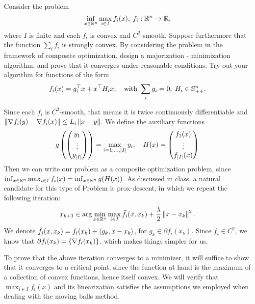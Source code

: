 \documentclass[10pt]{article}
\begin{document}
\begin{Exercise}
    Consider the problem
    \[
        \inf_{x \in \mathbb{R}^n} \max_{i \in I} f_i(x), \;
        f_i : \mathbb{R}^n \to \mathbb{R},
    \]
    where $I$ is finite and each $f_i$ is convex and $C^2$-smooth. Suppose
    furthermore that the function $\sum_i f_i$ is strongly convex. By
    considering the problem in the framework of composite optimization, design
    a majorization - minimization algorithm, and prove that it converges under
    reasonable conditions. Try out your algorithm for functions of the form
    \[
        f_i(x) = g_i^\top x + x^\top H_i x, \quad \text{with }
        \sum_i g_i = 0, \; H_i \in \mathbb{S}_{++}^n.
    \]
\end{Exercise}
\begin{Answer}
    Since each $f_i$ is $C^2$-smooth, that means it is twice continuously
    differentiable and $\left \| \nabla f_i (y) - \nabla f_i (x) \right \| \leq L_i \left \| x -
    y \right \|$. We define the auxiliary functions
    \[
        g\left(
            \begin{pmatrix} y_1 \\ \vdots \\ y_{\left| I \right|} \end{pmatrix}
        \right) = \max_{i=1, \dots, \left| I \right|} y_i, \quad
        H(x) = \begin{pmatrix} 
            f_1(x) \\ \vdots \\ f_{\left| I \right|}(x) \end{pmatrix}
    \]
    Then we can write our problem as a composite optimization problem, since
    $\inf_{x \in \mathbb{R}^n} \max_{i \in I} f_i(x) = \inf_{x \in \mathbb{R}^n} g(H(x))$.
    As discussed in class, a natural candidate for this type of Problem is
    prox-descent, in which we repeat the following iteration:
    \[
        x_{k+1} \in \arg \min_{x \in \mathbb{R}^n} \max_{i \in I} \bar{f}_i(x, x_k) +
        \frac{\lambda}{2} \left \| x - x_k \right \|^2.
    \]
    We denote $\bar{f}_i(x, x_k) = f_i(x_k) + \left\langle g_k, x - x_k \right\rangle$, for $g_k \in
    \partial f_i(x_k)$. Since $f_i \in C^2$, we know that $\partial f_i(x_k)
    = \left\{ \nabla f_i(x_k) \right\}$, which makes things simpler for us.

    To prove that the above iteration converges to a minimizer, it will suffice
    to show that it converges to a critical point, since the function at hand
    is the maximum of a collection of convex functions, hence itself convex. We
    will verify that $\max_{i \in I} f_i(x)$ and its linearization satisfies
    the assumptions we employed when dealing with the moving balls method.


\end{Answer}
\end{document}
